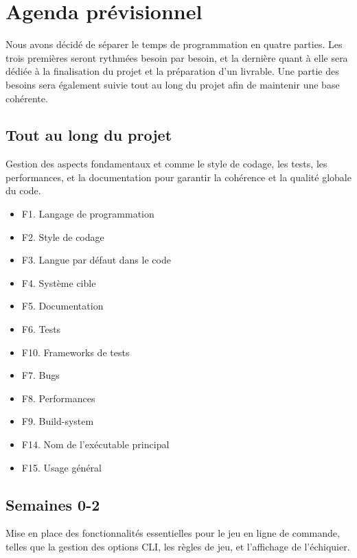 \documentclass{article}
\begin{document}
\section{Agenda prévisionnel}
\label{agenda}

Nous avons décidé de séparer le temps de programmation en quatre parties. Les trois premières seront rythmées besoin par besoin, et la dernière quant à elle sera dédiée à la finalisation du projet et la préparation d'un livrable.
Une partie des besoins sera également suivie tout au long du projet afin de maintenir une base cohérente.

\subsection{Tout au long du projet}

Gestion des aspects fondamentaux et comme le style de codage, les tests, les performances, et la documentation pour garantir la cohérence et la qualité globale du code.

\begin{itemize}
    \item F1. Langage de programmation
    \item F2. Style de codage
    \item F3. Langue par défaut dans le code
    \item F4. Système cible
    \item F5. Documentation
    \item F6. Tests
    \item F10. Frameworks de tests
    \item F7. Bugs
    \item F8. Performances
    \item F9. Build-system
    \item F14. Nom de l’exécutable principal
    \item F15. Usage général
\end{itemize}

\subsection{Semaines 0-2}

Mise en place des fonctionnalités essentielles pour le jeu en ligne de commande, telles que la gestion des options CLI, les règles de jeu, et l'affichage de l'échiquier.
\end{document}
